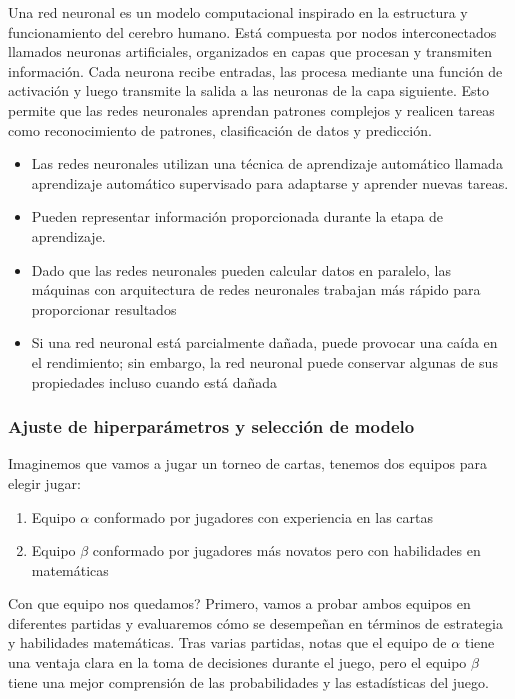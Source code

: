 Una red neuronal es un modelo computacional inspirado en la estructura y funcionamiento del 
cerebro humano. Está compuesta por nodos interconectados llamados neuronas artificiales, 
organizados en capas que procesan y transmiten información. Cada neurona recibe entradas, las 
procesa mediante una función de activación y luego transmite la salida a las neuronas de la capa 
siguiente. Esto permite que las redes neuronales aprendan patrones complejos y realicen tareas 
como reconocimiento de patrones, clasificación de datos y predicción.

\begin{itemize}
    \item Las redes neuronales utilizan una técnica de aprendizaje automático llamada aprendizaje 
    automático supervisado para adaptarse y aprender nuevas tareas.
    \item Pueden representar información proporcionada durante la etapa de aprendizaje.
    \item Dado que las redes neuronales pueden calcular datos en paralelo, las máquinas con 
    arquitectura de redes neuronales trabajan más rápido para proporcionar resultados
    \item Si una red neuronal está parcialmente dañada, puede provocar una caída en el 
    rendimiento; sin embargo, la red neuronal puede conservar algunas de sus propiedades 
    incluso cuando está dañada
\end{itemize}

\subsubsection*{Ajuste de hiperparámetros y selección de modelo}


Imaginemos que vamos a jugar un torneo de cartas, tenemos dos equipos para elegir jugar:
\begin{enumerate}
    \item Equipo $\alpha$ conformado por jugadores con experiencia en las cartas
    \item Equipo $\beta$ conformado por jugadores más novatos pero con habilidades en matemáticas
\end{enumerate}

Con que equipo nos quedamos? Primero, vamos a probar ambos equipos en diferentes partidas y 
evaluaremos cómo se desempeñan en términos de estrategia y habilidades matemáticas. Tras varias 
partidas, notas que el equipo de $\alpha$ tiene una ventaja clara en la toma de decisiones durante 
el juego, pero el equipo $\beta$ tiene una mejor comprensión de las probabilidades y las 
estadísticas del juego.\\


